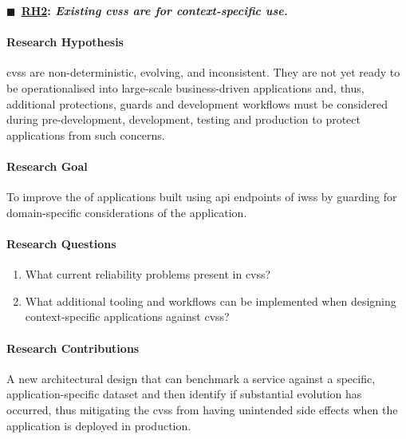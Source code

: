 \ifdefined\review\else\begin{titled-frame}\fi
{$\blacksquare$~\bfseries \underline{RH2}: \textit{Existing \glspl{cvs} are  for context-specific use.} }
\label{rh2}
\vspace{-12pt}
\paragraph{Research Hypothesis}
\glspl{cvs} are non-deterministic, evolving, and inconsistent. They are not yet ready to be operationalised into large-scale business-driven applications and, thus, additional protections, guards and development workflows must be considered during pre-development, development, testing and production to protect applications from such concerns.

\paragraph{Research Goal}
To improve the  of applications built using \gls{api} endpoints of \glspl{iws} by guarding for domain-specific considerations of the application.

\paragraph{Research Questions}
\begin{enumerate}[label=\textbf{RQ2.\arabic*.}, ref=RQ2.\arabic*, leftmargin=3.5\parindent, rightmargin=1\parindent]
  \item What current reliability problems present in \glspl{cvs}? 
  \label{rqs:metadata:what-problems-du                                                                e-to-lack-of-metadata}
    
  \item What additional tooling and workflows can be implemented when designing context-specific applications against \glspl{cvs}? 
  \label{rqs:metadata:what-metadata-do-devs-want-and-why}  %
\end{enumerate}

\paragraph{Research Contributions} A new architectural design that can benchmark a service against a specific, application-specific dataset and then identify if substantial evolution has occurred, thus mitigating the \glspl{cvs} from having unintended side effects when the application is deployed in production.
\ifdefined\review\else\end{titled-frame}\fi

